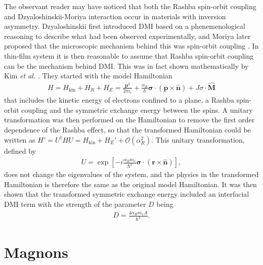 \documentclass[12pt, a4paper, twoside, openright]{report}
\DeclareRobustCommand{\orderof}{\ensuremath{\mathcal{O}}}
\numberwithin{equation}{chapter}
\numberwithin{figure}{chapter}
\numberwithin{table}{chapter}
\begin{document}
The observant reader may have noticed that both the Rashba spin-orbit coupling and Dzyaloshinskii-Moriya interaction occur in materials with inversion asymmetry. Dzyaloshinskii first introduced DMI based on a phenemenological reasoning \citep{Dzyaloshinskii1958} to describe what had been observed experimentally, and Moriya later proposed that the microscopic mechanism behind this was spin-orbit coupling \cite{Moriya1960}. In thin-film system it is then reasonable to assume that Rashba spin-orbit coupling can be the mechanism behind DMI. This was in fact shown mathematically by Kim \textit{et al.} \citep{DMIfromRashba_Kim}. They started with the model Hamiltonian
\begin{align}
H = H_{\textrm{kin}} + H_R + H_E = \frac{\mathbold{p}^2}{2m_e} + \frac{\alpha_R}{\hbar}\mathbold{\sigma}\cdot(\mathbold{p}\times\mathbold{\hat{n}}) + J\sigma\cdot\mathbold{\hat{M}}
\end{align}
that includes the kinetic energy of electrons confined to a plane, a Rashba spin-orbit coupling and the symmetric exchange energy between the spins. A unitary transformation was then performed on the Hamiltonian to remove the first order dependence of the Rashba effect, so that the transformed Hamiltonian could be written as $H' = U^{\dagger} H U = H_{\textrm{kin}} + H_E' + \orderof(\alpha_R^2)$. This unitary transformation, defined by
\begin{align}
U = \exp\left[-i\frac{\alpha_R m_e}{\hbar^2}\mathbold{\sigma}\cdot(\mathbold{r}\times\mathbold{\hat{n}})\right],
\end{align}
does not change the eigenvalues of the system, and the physics in the transformed Hamiltonian is therefore the same as the original model Hamiltonian. It was then shown that the transformed symmetric exchange energy included an interfacial DMI term with the strength of the parameter $D$ being
\begin{align}
D = \frac{4\alpha_Rm_e A}{\hbar^2}.
\end{align}

\section{Magnons}
\end{document}
